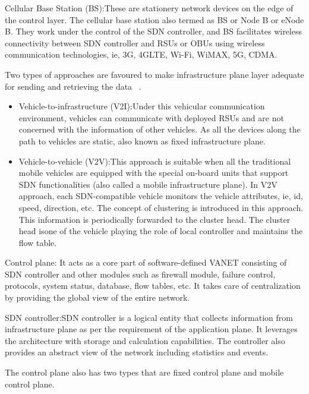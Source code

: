 \documentclass[
  oneside,
  11pt, a4paper,
  footinclude=true,
  headinclude=true,
  cleardoublepage=empty
]{scrbook}
\begin{document}
Cellular Base Station (BS):These are stationery network devices on the edge of the control layer. The cellular base station also termed as BS or Node B or eNode B. They work under the control of the SDN controller, and BS facilitates wireless connectivity between SDN controller and RSUs or OBUs using wireless communication technologies, ie, 3G, 4GLTE, Wi-Fi, WiMAX, 5G, CDMA.\par
Two types of approaches are favoured to make infrastructure plane layer adequate for sending and retrieving the data ~\cite{Bhatia2019sdvn}.
\begin{itemize}
    \item Vehicle-to-infrastructure (V2I):Under this vehicular communication environment, vehicles can communicate with deployed RSUs and are not concerned with the information of other vehicles. As all the devices along the path to vehicles are static, also known as fixed infrastructure plane.
    \item Vehicle-to-vehicle (V2V):This approach is suitable when all the traditional mobile vehicles are equipped with the special on-board units that support SDN functionalities (also called a mobile infrastructure plane). In V2V approach, each SDN-compatible vehicle monitors the vehicle attributes, ie, id, speed, direction, etc. The concept of clustering is introduced in this approach. This information is periodically forwarded to the cluster head. The cluster head isone of the vehicle playing the role of local controller and maintains the flow table.\par
\end{itemize}


Control plane: It acts as a core part of software-defined VANET consisting of SDN controller and other modules such as firewall module, failure control, protocols, system status, database, flow tables, etc. It takes care of centralization by providing the global view of the entire network.\par
SDN controller:SDN controller is a logical entity that collects information from infrastructure plane as per the requirement of the application plane. It leverages the architecture with storage and calculation capabilities. The controller also provides an abstract view of the network including statistics and events.\par
The control plane also has two types that are fixed control plane and mobile control plane.\par
\end{document}
